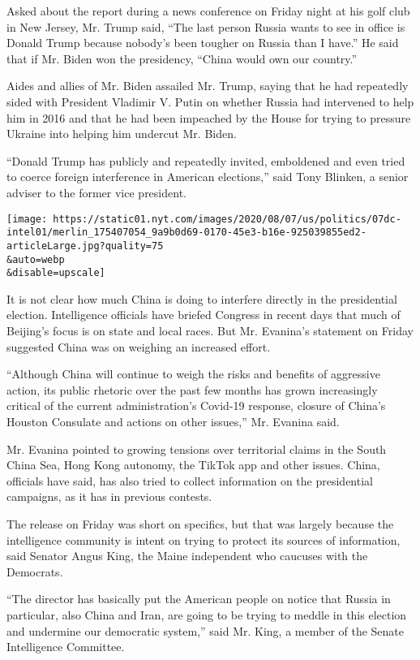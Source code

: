 Asked about the report during a news conference on Friday night at his
golf club in New Jersey, Mr. Trump said, ``The last person Russia wants
to see in office is Donald Trump because nobody's been tougher on Russia
than I have.'' He said that if Mr. Biden won the presidency, ``China
would own our country.''

Aides and allies of Mr. Biden assailed Mr. Trump, saying that he had
repeatedly sided with President Vladimir V. Putin on whether Russia had
intervened to help him in 2016 and that he had been impeached by the
House for trying to pressure Ukraine into helping him undercut Mr.
Biden.

``Donald Trump has publicly and repeatedly invited, emboldened and even
tried to coerce foreign interference in American elections,'' said Tony
Blinken, a senior adviser to the former vice president.

\texttt{[image: https://static01.nyt.com/images/2020/08/07/us/politics/07dc-intel01/merlin\_175407054\_9a9b0d69-0170-45e3-b16e-925039855ed2-articleLarge.jpg?quality=75\\\&auto=webp\\\&disable=upscale]}

It is not clear how much China is doing to interfere directly in the
presidential election. Intelligence officials have briefed Congress in
recent days that much of Beijing's focus is on state and local races.
But Mr. Evanina's statement on Friday suggested China was on weighing an
increased effort.

``Although China will continue to weigh the risks and benefits of
aggressive action, its public rhetoric over the past few months has
grown increasingly critical of the current administration's Covid-19
response, closure of China's Houston Consulate and actions on other
issues,'' Mr. Evanina said.

Mr. Evanina pointed to growing tensions over territorial claims in the
South China Sea, Hong Kong autonomy, the TikTok app and other issues.
China, officials have said, has also tried to collect information on the
presidential campaigns, as it has in previous contests.

The release on Friday was short on specifics, but that was largely
because the intelligence community is intent on trying to protect its
sources of information, said Senator Angus King, the Maine independent
who caucuses with the Democrats.

``The director has basically put the American people on notice that
Russia in particular, also China and Iran, are going to be trying to
meddle in this election and undermine our democratic system,'' said Mr.
King, a member of the Senate Intelligence Committee.

